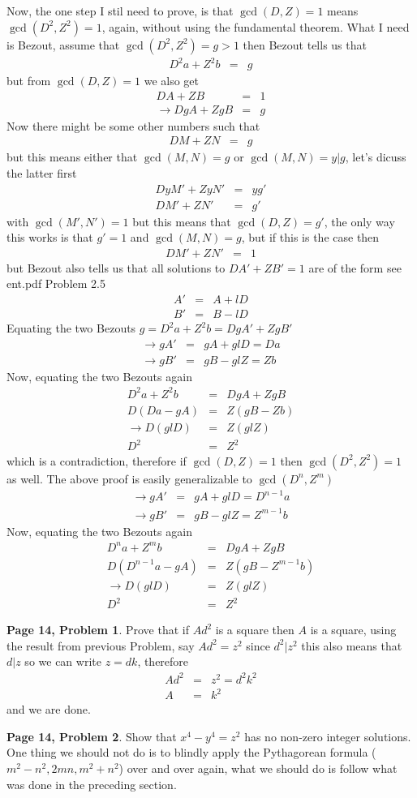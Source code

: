 \documentclass[aps,preprint,preprintnumbers,nofootinbib,showpacs,prd]{revtex4-1}
\newcommand{\nbea}{\begin{eqnarray*}}
\newcommand{\neea}{\end{eqnarray*}}
\begin{document}
Now, the one step I stil need to prove, is that $\gcd(D,Z) = 1$ means $\gcd(D^2,Z^2) = 1$, again, without using the fundamental theorem. What I need is Bezout, assume that $\gcd(D^2,Z^2) = g > 1$ then Bezout tells us that
%
\nbea
D^2 a + Z^2 b & = & g
\neea
%
but from $\gcd(D,Z)=1$ we also get
%
\nbea
D A + Z B & = & 1 \\
\to DgA + ZgB & = & g
\neea
%
Now there might be some other numbers such that
%
\nbea
D M + Z N & = & g
\neea
%
but this means either that $\gcd(M,N) = g$ or $\gcd(M,N) = y | g$, let's dicuss the latter first
%
\nbea
D y M' + Z y N' & = & yg' \\
D M' + Z N' & = & g'
\neea
%
with $\gcd(M',N') = 1$ but this means that $\gcd(D,Z) = g'$, the only way this works is that $g' = 1$ and $\gcd(M,N) = g$, but if this is the case then
%
\nbea
D M' + Z N' & = & 1
\neea
%
but Bezout also tells us that all solutions to $D A' + Z B' = 1$ are of the form see ent.pdf Problem 2.5
%
\nbea
A' & = & A + l D \\
B' & = & B - lD
\neea
%
Equating the two Bezouts $g = D^2 a + Z^2 b = DgA' + ZgB'$
%
\nbea
\to gA' & = & gA + gl D = Da\\
\to gB' & = & gB - gl Z = Zb 
\neea
%
Now, equating the two Bezouts again
%
\nbea
D^2 a + Z^2 b & = & DgA + ZgB \\
D(Da - gA) & = & Z(gB - Zb) \\
\to D(glD) & = & Z(glZ) \\
D^2 & = & Z^2
\neea
%
which is a contradiction, therefore if $\gcd(D,Z) = 1$ then $\gcd(D^2,Z^2) = 1$ as well. The above proof is easily generalizable to $\gcd(D^n,Z^m)$
%
\nbea
\to gA' & = & gA + gl D = D^{n-1}a\\
\to gB' & = & gB - gl Z = Z^{m-1}b 
\neea
%
Now, equating the two Bezouts again
%
\nbea
D^n a + Z^m b & = & DgA + ZgB \\
D(D^{n-1}a - gA) & = & Z(gB - Z^{m-1}b) \\
\to D(glD) & = & Z(glZ) \\
D^2 & = & Z^2
\neea
%

{\bf Page 14, Problem 1}. Prove that if $Ad^2$ is a square then $A$ is a square, using the result from previous Problem, say $Ad^2 = z^2$ since $d^2|z^2$ this also means that $d|z$ so we can write $z = dk$, therefore
%
\nbea
Ad^2 & = & z^2 = d^2k^2 \\
A & = & k^2
\neea
%
and we are done.

{\bf Page 14, Problem 2}. Show that $x^4 - y^4 = z^2$ has no non-zero integer solutions. One thing we should not do is to blindly apply the Pythagorean formula ($m^2-n^2, 2mn, m^2+n^2$) over and over again, what we should do is follow what was done in the preceding section.
\end{document}
